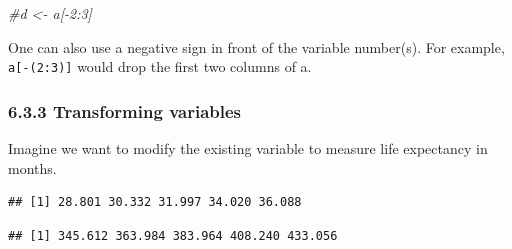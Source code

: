\documentclass[]{article}
\newenvironment{Shaded}{\begin{snugshade}}{\end{snugshade}}
\newcommand{\KeywordTok}[1]{\textcolor[rgb]{0.13,0.29,0.53}{\textbf{#1}}}
\newcommand{\DecValTok}[1]{\textcolor[rgb]{0.00,0.00,0.81}{#1}}
\newcommand{\StringTok}[1]{\textcolor[rgb]{0.31,0.60,0.02}{#1}}
\newcommand{\CommentTok}[1]{\textcolor[rgb]{0.56,0.35,0.01}{\textit{#1}}}
\newcommand{\OperatorTok}[1]{\textcolor[rgb]{0.81,0.36,0.00}{\textbf{#1}}}
\newcommand{\NormalTok}[1]{#1}
\begin{document}
\begin{Shaded}
\begin{Highlighting}[]
\CommentTok{#d <- a[-2:3]}
\end{Highlighting}
\end{Shaded}

One can also use a negative sign in front of the variable number(s). For
example, \texttt{a{[}-(2:3){]}} would drop the first two columns of a.

\subsubsection{6.3.3 Transforming
variables}\label{transforming-variables}

Imagine we want to modify the existing variable to measure life
expectancy in months.

\begin{Shaded}
\end{Shaded}

\begin{verbatim}
## [1] 28.801 30.332 31.997 34.020 36.088
\end{verbatim}

\begin{Shaded}
\end{Shaded}

\begin{verbatim}
## [1] 345.612 363.984 383.964 408.240 433.056
\end{verbatim}

\begin{Shaded}
\end{Shaded}
\end{document}
